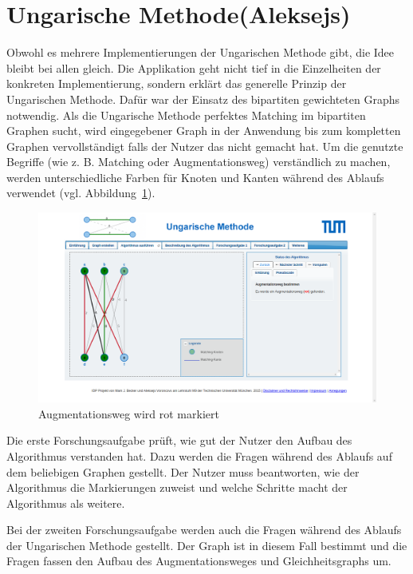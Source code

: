 \section{Ungarische Methode(Aleksejs)}
Obwohl es mehrere Implementierungen der Ungarischen Methode gibt, die Idee bleibt bei allen gleich. Die Applikation geht nicht tief in die Einzelheiten der konkreten Implementierung, sondern erklärt das generelle Prinzip der Ungarischen Methode. Dafür war der Einsatz des bipartiten gewichteten Graphs notwendig. Als die Ungarische Methode perfektes Matching im bipartiten Graphen sucht, wird eingegebener Graph in der Anwendung bis zum kompletten Graphen vervollständigt falls der Nutzer das nicht gemacht hat. Um die genutzte Begriffe (wie z. B. Matching oder Augmentationsweg) verständlich zu machen, werden unterschiedliche Farben für Knoten und Kanten während des Ablaufs verwendet (vgl. Abbildung~\ref{fig:hungarian-colors}).
\begin{figure}[h!]
	\centering
	\includegraphics[width=\textwidth]{figures/hungarian-colors}
	\caption[Ungarische Methode]{Augmentationsweg wird rot markiert}\label{fig:hungarian-colors}
\end{figure}

Die erste Forschungsaufgabe prüft, wie gut der Nutzer den Aufbau des Algorithmus verstanden hat. Dazu werden die Fragen während des Ablaufs auf dem beliebigen Graphen gestellt. Der Nutzer muss beantworten, wie der Algorithmus die Markierungen zuweist und welche Schritte macht der Algorithmus als weitere. 

Bei der zweiten Forschungsaufgabe werden auch die Fragen während des Ablaufs der Ungarischen Methode gestellt. Der Graph ist in diesem Fall bestimmt und die Fragen fassen den Aufbau des Augmentationsweges und Gleichheitsgraphs um.

